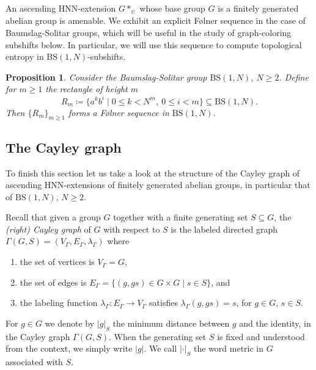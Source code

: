 \documentclass[letterpaper,11pt,reqno]{amsart}
\theoremstyle{plain}
\newtheorem{proposition}[theorem]{Proposition}
\theoremstyle{definition}
\theoremstyle{cupremark}
\newcommand{\BS}[1][N]{\mathrm{BS}(1,#1)}
\begin{document}
An ascending HNN-extension $G*_{\psi}$ whose base group $G$ is a finitely generated abelian group is amenable. We exhibit an explicit F\o lner sequence in the case of Baumslag-Solitar groups, which will be useful in the study of graph-coloring subshifts below. In particular, we will use this sequence to compute topological entropy in $\BS$-subshifts.


\begin{proposition}\label{prop:rectangles_and_folner} Consider the Baumslag-Solitar group $\BS$, $N\ge 2$. Define for $m\ge 1$ the \textit{rectangle of height $m$}
	$$
	R_m\coloneqq \{a^kb^i\mid 0\le k<N^m, \ 0\le i<m  \}\subseteq \BS.
	$$
	Then $\{R_m\}_{m\ge 1}$ forms a F\o lner sequence in $\BS$.
\end{proposition}




\subsection{The Cayley graph }\label{subsection:Cayley}

To finish this section let us take a look at the structure of the Cayley graph of ascending HNN-extensions of finitely generated abelian groups, in particular that of $\BS$, $N\ge 2$. 

Recall that given a group $G$ together with a finite generating set $S\subseteq G$, the \textit{(right) Cayley graph} of $G$ with respect to $S$ is the labeled directed graph  $\Gamma(G,S)=(V_{\Gamma},E_{\Gamma},\lambda_{\Gamma})$ where
\begin{enumerate}
	\item the set of vertices is $V_\Gamma=G$, 
	\item the set of edges is $E_{\Gamma}=\{(g,gs)\in G\times G\mid s\in S\}$, and
	\item the labeling function $\lambda_{\Gamma}:E_{\Gamma}\to V_{\Gamma}$ satisfies $\lambda_{\Gamma}(g,gs)=s$, for $g\in G$, $s\in S$.
\end{enumerate}
For $g\in G$ we denote by $|g|_S$ the minimum distance between $g$ and the identity, in the Cayley graph $\Gamma(G,S)$. When the generating set $S$ is fixed and understood from the context, we simply write $|g|$. We call $|\cdot|_S$ the word metric in $G$ associated with $S$.
\end{document}
